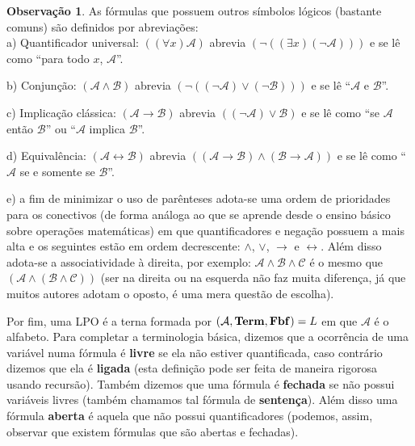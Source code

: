 \documentclass[11pt,a4paper]{article}
\theoremstyle{definition}
\newtheorem{obs}[mydef]{Observação}
\begin{document}
\begin{obs}
	
	As fórmulas que possuem outros símbolos lógicos (bastante comuns) são definidos por abreviações:\\
	
	a) Quantificador universal: $((\forall x) \mathscr{A})$ abrevia $(\neg ((\exists x)(\neg \mathscr{A})))$ e se lê como ``para todo $x$,  $\mathscr{A}$''.
	
	b) Conjunção: $(\mathscr{A} \wedge \mathscr{B})$ abrevia $(\neg ((\neg \mathscr{A}) \vee (\neg \mathscr{B})))$ e se lê ``$\mathscr{A}$ e $\mathscr{B}$''.
	
	c) Implicação clássica: $(\mathscr{A} \rightarrow \mathscr{B})$ abrevia $((\neg \mathscr{A}) \vee \mathscr{B})$ e se lê como ``se $\mathscr{A}$ então $\mathscr{B}$'' ou ``$\mathscr{A}$ implica $\mathscr{B}$''. 
	
	d) Equivalência: $(\mathscr{A} \leftrightarrow  \mathscr{B})$ abrevia $((\mathscr{A} \rightarrow \mathscr{B})\wedge (\mathscr{B} \rightarrow \mathscr{A}))$ e se lê como ``$\mathscr{A}$ se e somente se $\mathscr{B}$''.
	
	e) a fim de minimizar o uso de parênteses adota-se uma ordem de prioridades para os conectivos (de forma análoga ao que se aprende desde o ensino básico sobre operações matemáticas) em que quantificadores e negação possuem a mais alta e os seguintes estão em ordem decrescente: $\wedge$, $\vee$, $\rightarrow$ e $\leftrightarrow$. Além disso adota-se a associatividade à direita, por exemplo: $\mathscr{A}\wedge \mathscr{B} \wedge \mathscr{C}$ é o mesmo que $(\mathscr{A}\wedge (\mathscr{B} \wedge \mathscr{C}))$ (ser na direita ou na esquerda não faz muita diferença, já que muitos autores adotam o oposto, é uma mera questão de escolha).
	
	
	
\end{obs}

Por fim, uma LPO é a terna formada por $(\mathcal{A},\textrm{\textbf{Term}},\textrm{\textbf{Fbf}})=L$ em que $\mathcal{A}$ é o alfabeto. Para completar a terminologia básica, dizemos que a ocorrência de uma variável numa fórmula é \textbf{livre} se ela não estiver quantificada, caso contrário dizemos que ela é \textbf{ligada} (esta definição pode ser feita de maneira rigorosa usando recursão). Também dizemos que uma fórmula é \textbf{fechada} se não possui variáveis livres (também chamamos tal fórmula de \textbf{sentença}). Além disso uma fórmula \textbf{aberta} é aquela que não possui quantificadores (podemos, assim, observar que existem fórmulas que são abertas e fechadas).
\end{document}
